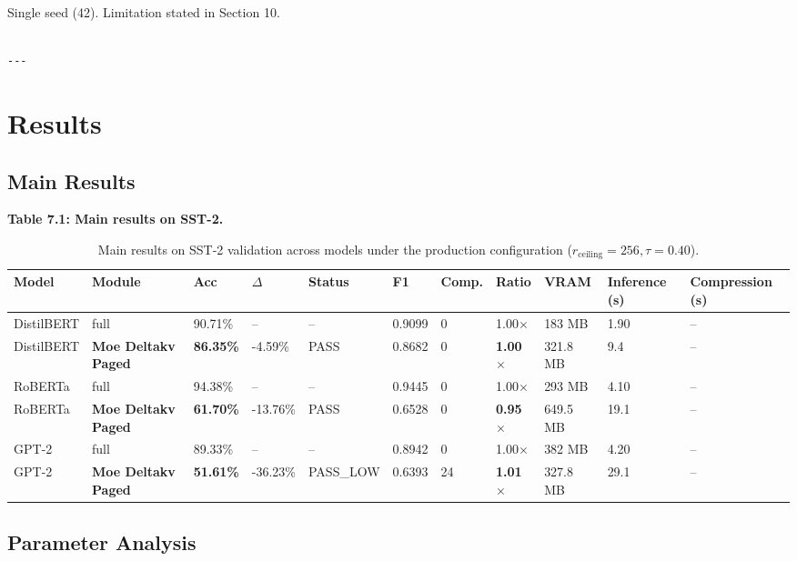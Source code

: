 Single seed (42). Limitation stated in Section 10.
\begin{lstlisting}

---
\end{lstlisting}

\section{Results}

\subsection{Main Results}

\textbf{Table 7.1: Main results on SST-2.}

\begin{table}[t]
\centering
\small
\begin{tabular}{lllllllllll}
\toprule
\textbf{Model} & \textbf{Module} & \textbf{Acc} & \textbf{$\Delta$} & \textbf{Status} & \textbf{F1} & \textbf{Comp.} & \textbf{Ratio} & \textbf{VRAM} & \textbf{Inference (s)} & \textbf{Compression (s)} \\
\midrule
DistilBERT & full & 90.71\% & -- & -- & 0.9099 & 0 & 1.00$\times$ & 183 MB & 1.90 & -- \\
DistilBERT & \textbf{Moe Deltakv Paged} & \textbf{86.35\%} & -4.59\% & PASS & 0.8682 & 0 & \textbf{1.00$\times$} & 321.8 MB & 9.4 & -- \\
RoBERTa & full & 94.38\% & -- & -- & 0.9445 & 0 & 1.00$\times$ & 293 MB & 4.10 & -- \\
RoBERTa & \textbf{Moe Deltakv Paged} & \textbf{61.70\%} & -13.76\% & PASS & 0.6528 & 0 & \textbf{0.95$\times$} & 649.5 MB & 19.1 & -- \\
GPT-2 & full & 89.33\% & -- & -- & 0.8942 & 0 & 1.00$\times$ & 382 MB & 4.20 & -- \\
GPT-2 & \textbf{Moe Deltakv Paged} & \textbf{51.61\%} & -36.23\% & PASS\_LOW & 0.6393 & 24 & \textbf{1.01$\times$} & 327.8 MB & 29.1 & -- \\
\bottomrule
\end{tabular}
\caption{Main results on SST-2 validation across models under the production configuration ($r_{\mathrm{ceiling}}=256, \tau=0.40$).}
\label{tab:main_sst2}
\end{table}

\subsection{Parameter Analysis}

